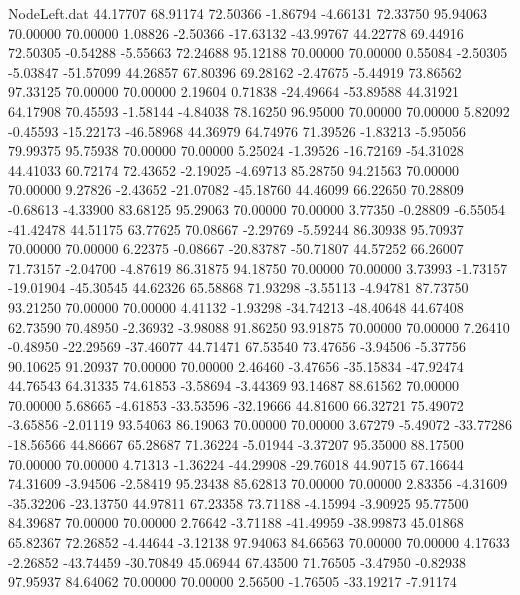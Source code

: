 \begin{filecontents}{NodeLeft.dat}
  44.17707   68.91174   72.50366    -1.86794   -4.66131   72.33750   95.94063   70.00000   70.00000    1.08826   -2.50366  -17.63132  -43.99767
  44.22778   69.44916   72.50305    -0.54288   -5.55663   72.24688   95.12188   70.00000   70.00000    0.55084   -2.50305   -5.03847  -51.57099
  44.26857   67.80396   69.28162    -2.47675   -5.44919   73.86562   97.33125   70.00000   70.00000    2.19604    0.71838  -24.49664  -53.89588
  44.31921   64.17908   70.45593    -1.58144   -4.84038   78.16250   96.95000   70.00000   70.00000    5.82092   -0.45593  -15.22173  -46.58968
  44.36979   64.74976   71.39526    -1.83213   -5.95056   79.99375   95.75938   70.00000   70.00000    5.25024   -1.39526  -16.72169  -54.31028
  44.41033   60.72174   72.43652    -2.19025   -4.69713   85.28750   94.21563   70.00000   70.00000    9.27826   -2.43652  -21.07082  -45.18760
  44.46099   66.22650   70.28809    -0.68613   -4.33900   83.68125   95.29063   70.00000   70.00000    3.77350   -0.28809   -6.55054  -41.42478
  44.51175   63.77625   70.08667    -2.29769   -5.59244   86.30938   95.70937   70.00000   70.00000    6.22375   -0.08667  -20.83787  -50.71807
  44.57252   66.26007   71.73157    -2.04700   -4.87619   86.31875   94.18750   70.00000   70.00000    3.73993   -1.73157  -19.01904  -45.30545
  44.62326   65.58868   71.93298    -3.55113   -4.94781   87.73750   93.21250   70.00000   70.00000    4.41132   -1.93298  -34.74213  -48.40648
  44.67408   62.73590   70.48950    -2.36932   -3.98088   91.86250   93.91875   70.00000   70.00000    7.26410   -0.48950  -22.29569  -37.46077
  44.71471   67.53540   73.47656    -3.94506   -5.37756   90.10625   91.20937   70.00000   70.00000    2.46460   -3.47656  -35.15834  -47.92474
  44.76543   64.31335   74.61853    -3.58694   -3.44369   93.14687   88.61562   70.00000   70.00000    5.68665   -4.61853  -33.53596  -32.19666
  44.81600   66.32721   75.49072    -3.65856   -2.01119   93.54063   86.19063   70.00000   70.00000    3.67279   -5.49072  -33.77286  -18.56566
  44.86667   65.28687   71.36224    -5.01944   -3.37207   95.35000   88.17500   70.00000   70.00000    4.71313   -1.36224  -44.29908  -29.76018
  44.90715   67.16644   74.31609    -3.94506   -2.58419   95.23438   85.62813   70.00000   70.00000    2.83356   -4.31609  -35.32206  -23.13750
  44.97811   67.23358   73.71188    -4.15994   -3.90925   95.77500   84.39687   70.00000   70.00000    2.76642   -3.71188  -41.49959  -38.99873
  45.01868   65.82367   72.26852    -4.44644   -3.12138   97.94063   84.66563   70.00000   70.00000    4.17633   -2.26852  -43.74459  -30.70849
  45.06944   67.43500   71.76505    -3.47950   -0.82938   97.95937   84.64062   70.00000   70.00000    2.56500   -1.76505  -33.19217   -7.91174

\end{filecontents}
